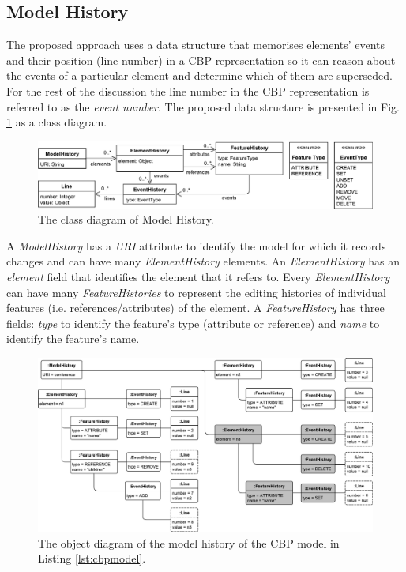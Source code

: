 \documentclass{llncs}
\begin{document}
\subsection{Model History}
\label{subsec:model_history}
The proposed approach uses a data structure that memorises elements' events and their position (line number) in a CBP representation so it can reason about the events of a particular element and determine which of them are superseded.
For the rest of the discussion the line number in the CBP representation is referred to as the \emph{event number}.
The proposed data structure is presented in Fig. \ref{fig:object_history} as a class diagram.  

\begin{figure}[ht]
\centering
\includegraphics[width=\linewidth]{object_history}
\caption{The class diagram of Model History.}
\label{fig:object_history}
\end{figure}

A \emph{ModelHistory} has a \emph{URI} attribute to identify the model for which it records changes and can have many \emph{ElementHistory} elements.
An \emph{ElementHistory} has an \emph{element} field that identifies the element that it refers to. 
Every \emph{ElementHistory} can have many \emph{FeatureHistories} to represent the editing histories of individual features (i.e. references/attributes) of the element. 
A \emph{FeatureHistory} has three fields: \emph{type} to identify the feature's type (attribute or reference) and \emph{name} to identify the feature's name.

\begin{figure}[ht]
    \centering
    \includegraphics[width=\linewidth]{history_structure}
    \caption{The object diagram of the model history of the CBP model in Listing \ref{lst:cbpmodel}.}
    \label{fig:history_structure}
\end{figure}
\end{document}

